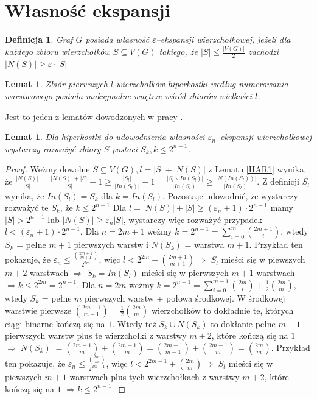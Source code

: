 \documentclass{pracamgr}
\newtheorem{defi}{Definicja}[section] %
\newtheorem{lemma}[theorem]{Lemat}
\begin{document}
  \section{Własność ekspansji}
   \begin{defi}\label{epsilon ekspansja wierzcholkowa}
    Graf $G$ posiada własność \emph{$\varepsilon$--ekspansji wierzchołkowej}, jeżeli dla każdego zbioru wierzchołków $S\subseteq V(G)$ takiego,
    że $|S|\le\frac{|V(G)|}{2}$ zachodzi $|N(S)|\ge\varepsilon\cdot|S|$
   \end{defi}
   \begin{lemma}
    Zbiór pierwszych $l$ wierzchołków hiperkostki według numerowania warstwowego posiada maksymalne wnętrze wśród zbiorów wielkości $l$.  
   \end{lemma}\label{HAR1}
   Jest to jeden z lematów dowodzonych w pracy \cite{HAR}.
   \begin{lemma}\label{S->S_k}%
    Dla hiperkostki do udowodnienia własności $\varepsilon_n$--ekspansji wierzchołkowej wystarczy rozważyć zbiory $S$ postaci $S_k,k\le 2^{n-1}$.
   \end{lemma}
   \begin{proof}
    Weżmy dowolne $S\subseteq V(G), l=|S|+|N(S)|$ z Lematu \ref{HAR1} wynika, że
    $\frac{|N(S)|}{|S|}=\frac{|N(S)|+|S|}{|S|}-1\ge\frac{|S_l|}{|In(S_l)|}-1=\frac{|S_l\backslash In(S_l)|}{|In(S_l)|}\ge\frac{|N(In(S_l))|}{|In(S_l)|}$.
    Z definicji $S_l$ wynika, że $In(S_l)=S_k$ dla $k=In(S_l)$.\newline
    Pozostaje udowodnić, że wystarczy rozważyć te $S_k$, że $k\le2^{n-1}$\newline
    Dla $l=|N(S)|+|S|\ge(\varepsilon_n+1)\cdot 2^{n-1}$ mamy $|S|>2^{n-1}$ lub $|N(S)|\ge\varepsilon_n|S|$, wystarczy więc rozważyć przypadek
    $l<(\varepsilon_n+1)\cdot 2^{n-1}$.\newline
    Dla $n=2m+1$ weżmy $k=2^{n-1}=\sum_{i=0}^{m}{2m+1 \choose i}$, wtedy $S_k$ = pełne $m+1$ pierwszych warstw i $N(S_k)$ = warstwa $m+1$.
    Przykład ten pokazuje, że $\varepsilon_n\le\frac{{2m+1 \choose m+1}}{2^{2m}}$,
    więc $l<2^{2m}+{2m+1 \choose m+1}\Rightarrow$ $S_l$ mieści się w piewszych $m+2$ warstwach
    $\Rightarrow$ $S_k=In(S_l)$ mieści się w pierwszych $m+1$ warstwach $\Rightarrow k\le 2^{2m}=2^{n-1}$.\newline
    Dla $n=2m$ weżmy $k=2^{n-1}=\sum_{i=0}^{m-1}{2m \choose i}+\frac{1}{2}{2m\choose m}$, wtedy $S_k$ = pełne $m$ pierwszych warstw + połowa środkowej.
    W środkowej warstwie pierwsze ${2m-1\choose m-1}=\frac{1}{2}{2m \choose m}$ wierzchołków to dokładnie te, których ciągi binarne kończą się na $1$.
    Wtedy też $S_k\cup N(S_k)$ to dokłanie pełne $m+1$ pierwszych warstw plus te wierzchołki z warstwy $m+2$, które kończą się na $1$
    $\Rightarrow |N(S_k)|={2m-1\choose m}+{2m-1\choose m}={2m-1\choose m-1}+{2m-1 \choose m}={2m\choose m}$.
    Przykład ten pokazuje, że $\varepsilon_n\le\frac{{2m \choose m}}{2^{2m-1}}$,
    więc $l<2^{2m-1}+{2m \choose m}\Rightarrow$ $S_l$ mieści się w piewszych $m+1$ warstwach plus tych wierzchołkach z warstwy $m+2$, które kończą się na $1$
    $\Rightarrow k\le2^{n-1}$.
   \end{proof}
\end{document}
